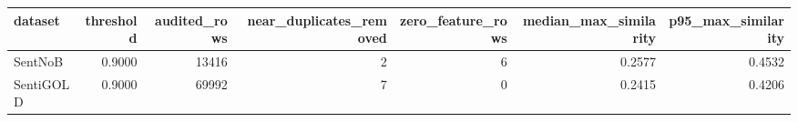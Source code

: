 \begin{tabular}{lrrrrrr}
\toprule
dataset & threshold & audited\_rows & near\_duplicates\_removed & zero\_feature\_rows & median\_max\_similarity & p95\_max\_similarity \\
\midrule
SentNoB & 0.9000 & 13416 & 2 & 6 & 0.2577 & 0.4532 \\
SentiGOLD & 0.9000 & 69992 & 7 & 0 & 0.2415 & 0.4206 \\
\bottomrule
\end{tabular}
